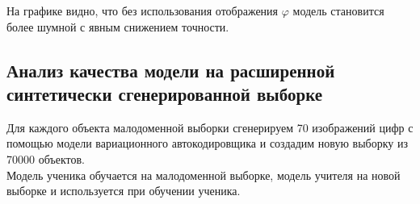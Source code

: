 На графике видно, что без использования отображения $\varphi$ модель становится более шумной с явным снижением точности.

\newpage
\subsection{Анализ качества модели на расширенной синтетически сгенерированной выборке}
Для каждого объекта малодоменной выборки сгенерируем 70 изображений цифр с помощью модели вариационного автокодировщика и создадим новую выборку из 70000 объектов.\\
Модель ученика обучается на малодоменной выборке, модель учителя на новой выборке и используется при обучении ученика.